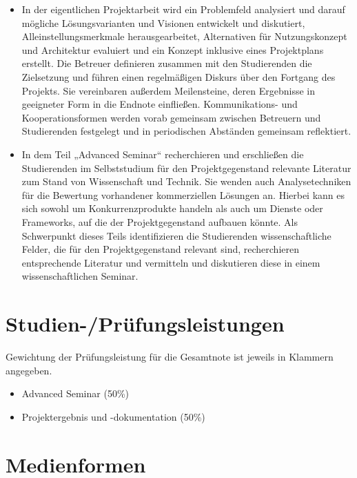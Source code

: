 \begin{itemize}
\tightlist
\item
  In der eigentlichen Projektarbeit wird ein Problemfeld analysiert und
  darauf mögliche Lösungsvarianten und Visionen entwickelt und
  diskutiert, Alleinstellungsmerkmale herausgearbeitet, Alternativen für
  Nutzungskonzept und Architektur evaluiert und ein Konzept inklusive
  eines Projektplans erstellt. Die Betreuer definieren zusammen mit den
  Studierenden die Zielsetzung und führen einen regelmäßigen Diskurs
  über den Fortgang des Projekts. Sie vereinbaren außerdem Meilensteine,
  deren Ergebnisse in geeigneter Form in die Endnote einfließen.
  Kommunikations- und Kooperationsformen werden vorab gemeinsam zwischen
  Betreuern und Studierenden festgelegt und in periodischen Abständen
  gemeinsam reflektiert.
\item
  In dem Teil „Advanced Seminar`` recherchieren und erschließen die
  Studierenden im Selbststudium für den Projektgegenstand relevante
  Literatur zum Stand von Wissenschaft und Technik. Sie wenden auch
  Analysetechniken für die Bewertung vorhandener kommerziellen Lösungen
  an. Hierbei kann es sich sowohl um Konkurrenzprodukte handeln als auch
  um Dienste oder Frameworks, auf die der Projektgegenstand aufbauen
  könnte. Als Schwerpunkt dieses Teils identifizieren die Studierenden
  wissenschaftliche Felder, die für den Projektgegenstand relevant sind,
  recherchieren entsprechende Literatur und vermitteln und diskutieren
  diese in einem wissenschaftlichen Seminar.
\end{itemize}

\section*{Studien-/Prüfungsleistungen\label{/mi-2017/modulbeschreibungen-master/MA_Modul_Projekt_Vision&Konzept}}\label{studien-pruxfcfungsleistungenpathlabelmi-2017modulbeschreibungen-mastermaux5fmodulux5fprojektux5fvisionkonzept}

Gewichtung der Prüfungsleistung für die Gesamtnote ist jeweils in
Klammern angegeben.

\begin{itemize}
\tightlist
\item
  Advanced Seminar (50\%)
\item
  Projektergebnis und -dokumentation (50\%)
\end{itemize}

\section*{Medienformen\label{/mi-2017/modulbeschreibungen-master/MA_Modul_Projekt_Vision&Konzept}}\label{medienformenpathlabelmi-2017modulbeschreibungen-mastermaux5fmodulux5fprojektux5fvisionkonzept}

